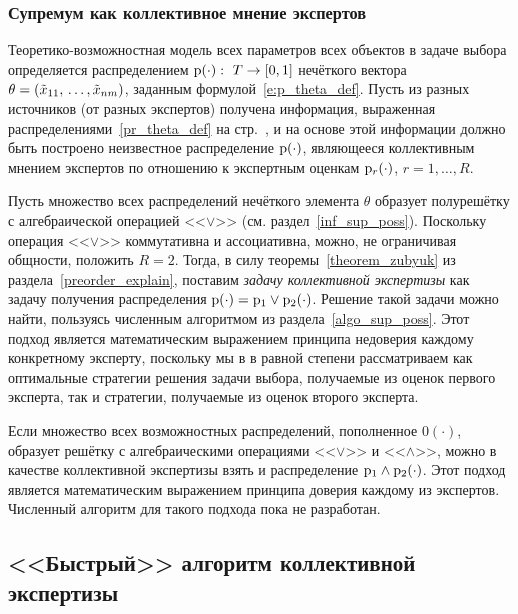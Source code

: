 \subsubsection{Супремум как коллективное мнение экспертов}

Теоретико-возможностная модель всех параметров всех объектов в задаче выбора определяется распределением ${\mathrm{p}}(\cdot):\ T\to[0,1]$ нечёткого вектора $\theta = (\tilde x_{11}, \, \ldots, \tilde x_{nm})$, заданным формулой~\eqref{e:p_theta_def}. Пусть из разных источников (от разных экспертов) получена информация, выраженная распределениями~\eqref{pr_theta_def} на стр.~\pageref{pr_theta_def}, и на основе этой информации должно быть построено неизвестное распределение ${\mathrm{p}}(\cdot)$, являющееся коллективным мнением экспертов по отношению к экспертным оценкам ${\mathrm{p}}_r(\cdot)$, $r = 1, \ldots, R$. 

Пусть множество всех распределений нечёткого элемента $\theta$ образует полурешётку с алгебраической операцией <<$\vee$>> (см. раздел~\ref{inf_sup_poss}). Поскольку операция <<$\vee$>> коммутативна и ассоциативна, можно, не ограничивая общности, положить $R = 2$. Тогда, в силу теоремы~\ref{theorem_zubyuk} из раздела~\ref{preorder_explain}, поставим { \em задачу коллективной экспертизы} как задачу получения распределения ${\mathrm{p}}(\cdot) = {\mathrm{p}}_1 \vee{\mathrm{p}}_2(\cdot)$. Решение такой задачи можно найти, пользуясь численным алгоритмом из раздела~\ref{algo_sup_poss}. Этот подход является математическим выражением принципа недоверия каждому конкретному эксперту, поскольку мы в в равной степени рассматриваем как оптимальные стратегии решения задачи выбора, получаемые из оценок первого эксперта, так и стратегии, получаемые из оценок второго эксперта. 
\begin{notice}
  Если множество всех возможностных распределений, пополненное $0(\cdot)$, образует решётку с алгебраическими операциями <<$\vee$>> и <<$\wedge$>>, можно в качестве коллективной экспертизы взять и распределение ${\mathrm{p}}_1\wedge{\mathrm{p}}_2(\cdot)$. Этот подход является математическим выражением принципа доверия каждому из экспертов. Численный алгоритм для такого подхода пока не разработан.  
\end{notice}

\subsection{<<Быстрый>> алгоритм коллективной экспертизы }

